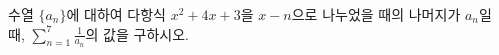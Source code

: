 \hspace*{2mm}\begin{minipage}[t]{\dimexpr\linewidth-2mm\relax}\vspace{0pt}
수열 $\{a_n\}$에 대하여 다항식 $x^2+4x+3$을 $x-n$으로 나누었을 때의 나머지가 $a_n$일 때, $\displaystyle\sum_{n=1}^{7}\frac{1}{a_n}$의 값을 구하시오.\end{minipage}
